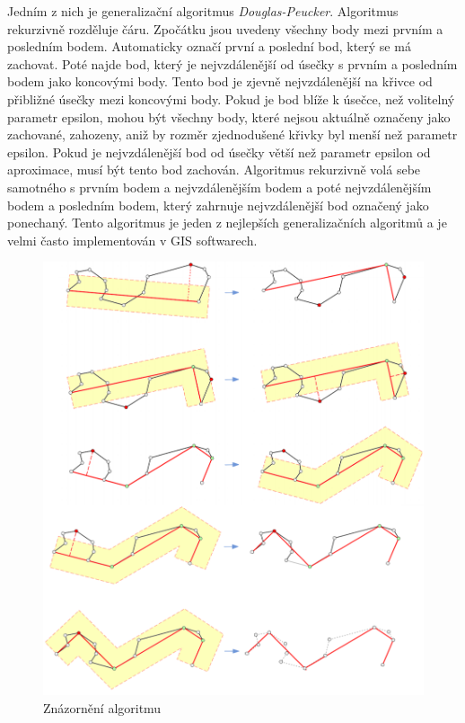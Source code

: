 Jedním z nich je generalizační algoritmus \textit{Douglas-Peucker}. Algoritmus rekurzivně rozděluje čáru.
Zpočátku jsou uvedeny všechny body mezi prvním a posledním bodem. Automaticky označí první a poslední bod,
který se má zachovat. Poté najde bod, který je nejvzdálenější od úsečky s prvním a posledním bodem 
jako koncovými body. Tento bod je zjevně nejvzdálenější na křivce od přibližné úsečky mezi koncovými body. 
Pokud je bod blíže k úsečce, než volitelný parametr epsilon, mohou být všechny body, které nejsou aktuálně označeny jako zachované,
zahozeny, aniž by rozměr zjednodušené křivky byl menší než parametr epsilon. Pokud je nejvzdálenější bod od úsečky větší než parametr epsilon od aproximace,
musí být tento bod zachován. Algoritmus rekurzivně volá sebe samotného s prvním bodem a nejvzdálenějším bodem 
a poté nejvzdálenějším bodem a posledním bodem, který zahrnuje nejvzdálenější bod označený jako ponechaný.
Tento algoritmus je jeden z nejlepších generalizačních algoritmů a je velmi často
implementován v GIS softwarech. \cite{bayer-douglas}

\begin{figure}[H] \centering
    \includegraphics[width=400pt]{./pictures/douglas.png}
    \caption[Znázornění algoritmu ]{Znázornění algoritmu  \cite{bayer-douglas}}
	\label{fig:douglas}              
\end{figure} 

